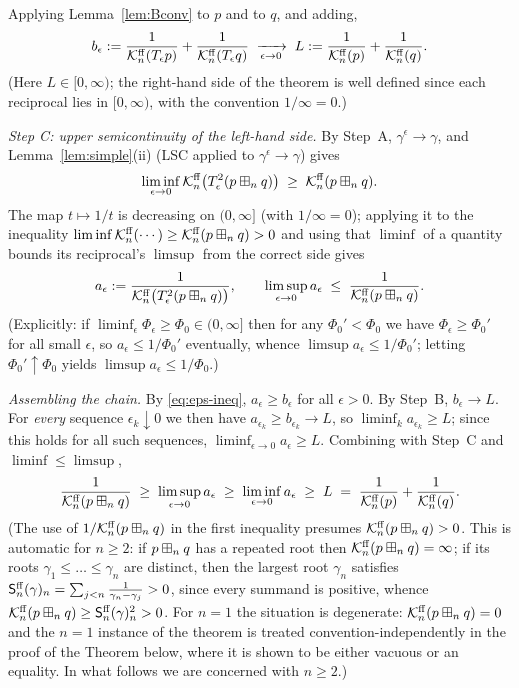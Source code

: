 \medskip
Applying Lemma~\ref{lem:Bconv} to $p$ and to $q$, and adding,
\[
b_\epsilon:=\frac{1}{\mathcal{K}^{\mathrm{ff}}_n(T_\epsilon p)}+\frac{1}{\mathcal{K}^{\mathrm{ff}}_n(T_\epsilon q)}
\;\xrightarrow[\epsilon\to0]{}\;
L:=\frac{1}{\mathcal{K}^{\mathrm{ff}}_n(p)}+\frac{1}{\mathcal{K}^{\mathrm{ff}}_n(q)} .
\]
(Here $L\in[0,\infty)$; the right-hand side of the theorem is well defined since
each reciprocal lies in $[0,\infty)$, with the convention $1/\infty=0$.)

\medskip
\noindent\textit{Step C: upper semicontinuity of the left-hand side.}
By Step~A, $\gamma^\epsilon\to\gamma$, and Lemma~\ref{lem:simple}(ii) (LSC applied
to $\gamma^\epsilon\to\gamma$) gives
\[
\liminf_{\epsilon\to 0}\mathcal{K}^{\mathrm{ff}}_n\bigl(T_\epsilon^2(p\boxplus_n q)\bigr)\;\ge\;\mathcal{K}^{\mathrm{ff}}_n(p\boxplus_n q).
\]
The map $t\mapsto 1/t$ is decreasing on $(0,\infty]$ (with $1/\infty=0$); applying
it to the inequality $\liminf \mathcal{K}^{\mathrm{ff}}_n(\cdots)\ge\mathcal{K}^{\mathrm{ff}}_n(p\boxplus_n q)>0$ and
using that $\liminf$ of a quantity bounds its reciprocal's $\limsup$ from the
correct side gives
\[
a_\epsilon:=\frac{1}{\mathcal{K}^{\mathrm{ff}}_n\bigl(T_\epsilon^2(p\boxplus_n q)\bigr)},\qquad
\limsup_{\epsilon\to 0}a_\epsilon\;\le\;\frac{1}{\mathcal{K}^{\mathrm{ff}}_n(p\boxplus_n q)}.
\]
(Explicitly: if $\liminf_\epsilon\Phi_\epsilon\ge\Phi_0\in(0,\infty]$ then for any
$\Phi_0'<\Phi_0$ we have $\Phi_\epsilon\ge\Phi_0'$ for all small $\epsilon$, so
$a_\epsilon\le 1/\Phi_0'$ eventually, whence $\limsup a_\epsilon\le 1/\Phi_0'$;
letting $\Phi_0'\uparrow\Phi_0$ yields $\limsup a_\epsilon\le 1/\Phi_0$.)

\medskip
\noindent\textit{Assembling the chain.}
By \eqref{eq:eps-ineq}, $a_\epsilon\ge b_\epsilon$ for all $\epsilon>0$. By Step~B,
$b_\epsilon\to L$. For \emph{every} sequence $\epsilon_k\downarrow 0$ we then have
$a_{\epsilon_k}\ge b_{\epsilon_k}\to L$, so $\liminf_{k}a_{\epsilon_k}\ge L$;
since this holds for all such sequences, $\liminf_{\epsilon\to0}a_\epsilon\ge L$.
Combining with Step~C and $\liminf\le\limsup$,
\[
\frac{1}{\mathcal{K}^{\mathrm{ff}}_n(p\boxplus_n q)}
\;\ge\;\limsup_{\epsilon\to 0}a_\epsilon
\;\ge\;\liminf_{\epsilon\to 0}a_\epsilon
\;\ge\;L
\;=\;\frac{1}{\mathcal{K}^{\mathrm{ff}}_n(p)}+\frac{1}{\mathcal{K}^{\mathrm{ff}}_n(q)}.
\]
(The use of $1/\mathcal{K}^{\mathrm{ff}}_n(p\boxplus_n q)$ in the first inequality presumes
$\mathcal{K}^{\mathrm{ff}}_n(p\boxplus_n q)>0$. This is automatic for $n\ge 2$: if $p\boxplus_n q$ has
a repeated root then $\mathcal{K}^{\mathrm{ff}}_n(p\boxplus_n q)=\infty$; if its roots
$\gamma_1\le\dots\le\gamma_n$ are distinct, then the largest root $\gamma_n$
satisfies $\mathsf{S}^{\mathrm{ff}}_n(\gamma)_n=\sum_{j<n}\frac{1}{\gamma_n-\gamma_j}>0$, since
every summand is positive, whence $\mathcal{K}^{\mathrm{ff}}_n(p\boxplus_n q)\ge\mathsf{S}^{\mathrm{ff}}_n(\gamma)_n^2>0$.
For $n=1$ the situation is degenerate: $\mathcal{K}^{\mathrm{ff}}_n(p\boxplus_n q)=0$ and the
$n=1$ instance of the theorem is treated convention-independently in the proof of
the Theorem below, where it is shown to be either vacuous or an equality. In what
follows we are concerned with $n\ge2$.)

